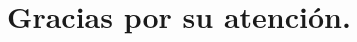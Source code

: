 {


\title[Gracias por su atención]{Gracias por su atención.}
\subtitle{}
\author{}
\institute{}
\date{}
\begin{frame}
    \titlepage
\end{frame}

}	
